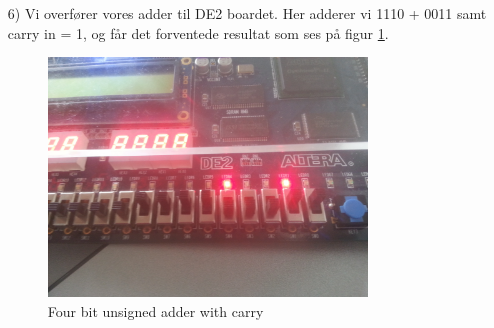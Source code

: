 \begin{enumerate}
	\item[6)]
	Vi overfører vores adder til DE2 boardet. Her adderer vi 1110 + 0011 samt carry in = 1, og får det forventede resultat som ses på figur \ref{fig:4bitUnsignedAdderCarry10100}.
	\begin{figure}[H]
		\centering
		\includegraphics[width=0.8\textwidth]{pictures/Oevelse3/4bit_unsigned_adder_carry2.jpg}
		\caption{Four bit unsigned adder with carry}
		\label{fig:4bitUnsignedAdderCarry10100}
	\end{figure}
	
\end{enumerate}